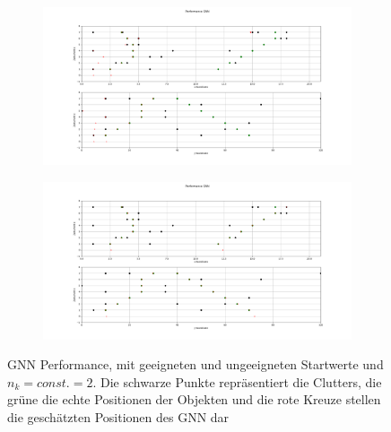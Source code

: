 \documentclass[10pt,a4paper]{article}
\begin{document}
\begin{figure}[h!]\label{pic:GNNSW}
    \centering
    \begin{subfigure}{0.6\textwidth}
        \includegraphics[width=13cm]{./Pictures_report/GNNTestdatenSW0.png}
    \end{subfigure}

\medskip
    \begin{subfigure}{0.6\textwidth}
        \includegraphics[width= 13cm]{./Pictures_report/GNNTestdatenSW1.png}
    \end{subfigure}
    \caption[]{GNN Performance, mit geeigneten und ungeeigneten Startwerte und $n_k = const. = 2$. Die schwarze Punkte repräsentiert die Clutters, die grüne die echte Positionen der Objekten und die rote Kreuze stellen die geschätzten Positionen des GNN dar }
    \label{pic:GNNSW}
\end{figure}
\end{document}
